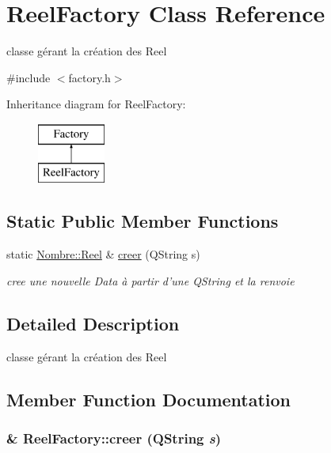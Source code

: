 \hypertarget{classReelFactory}{
\section{ReelFactory Class Reference}
\label{classReelFactory}
}


classe gérant la création des Reel  




{\ttfamily \#include $<$factory.h$>$}

Inheritance diagram for ReelFactory:\begin{figure}[H]
\begin{center}
\leavevmode
\includegraphics[height=2cm]{classReelFactory}
\end{center}
\end{figure}
\subsection*{Static Public Member Functions}
\begin{DoxyCompactItemize}
\item 
static \hyperlink{classNombre_1_1Reel}{Nombre::Reel} \& \hyperlink{classReelFactory_a09c1138eecb34e7ed2664b335ba6aa13}{creer} (QString s)
\begin{DoxyCompactList}\small\item\em cree une nouvelle Data à partir d'une QString et la renvoie \item\end{DoxyCompactList}\end{DoxyCompactItemize}


\subsection{Detailed Description}
classe gérant la création des Reel 

\subsection{Member Function Documentation}
\hypertarget{classReelFactory_a09c1138eecb34e7ed2664b335ba6aa13}{
\subsubsection[{creer}]{ \& ReelFactory::creer (QString {\em s})}}
\label{classReelFactory_a09c1138eecb34e7ed2664b335ba6aa13}


